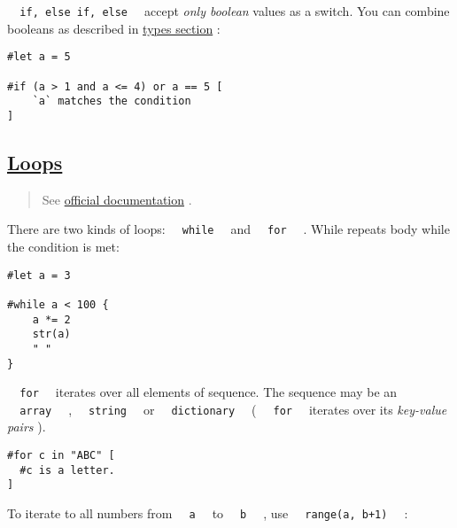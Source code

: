 \texttt{\ }{\texttt{\ if,\ else\ if,\ else\ }}\texttt{\ } accept
\emph{only boolean} values as a switch. You can combine booleans as
described in \href{./types.html\#boolean-bool}{types section} :

\begin{verbatim}
#let a = 5

#if (a > 1 and a <= 4) or a == 5 [
    `a` matches the condition
]
\end{verbatim}

\pandocbounded{}

\subsection{\texorpdfstring{\hyperref[loops]{Loops}}{Loops}}\label{loops}

\begin{quote}
See \href{https://typst.app/docs/reference/scripting/\#loops}{official
documentation} .
\end{quote}

There are two kinds of loops: \texttt{\ }{\texttt{\ while\ }}\texttt{\ }
and \texttt{\ }{\texttt{\ for\ }}\texttt{\ } . While repeats body while
the condition is met:

\begin{verbatim}
#let a = 3

#while a < 100 {
    a *= 2
    str(a)
    " "
}
\end{verbatim}

\pandocbounded{}

\texttt{\ }{\texttt{\ for\ }}\texttt{\ } iterates over all elements of
sequence. The sequence may be an
\texttt{\ }{\texttt{\ array\ }}\texttt{\ } ,
\texttt{\ }{\texttt{\ string\ }}\texttt{\ } or
\texttt{\ }{\texttt{\ dictionary\ }}\texttt{\ } (
\texttt{\ }{\texttt{\ for\ }}\texttt{\ } iterates over its
\emph{key-value pairs} ).

\begin{verbatim}
#for c in "ABC" [
  #c is a letter.
]
\end{verbatim}

\pandocbounded{}

To iterate to all numbers from \texttt{\ }{\texttt{\ a\ }}\texttt{\ } to
\texttt{\ }{\texttt{\ b\ }}\texttt{\ } , use
\texttt{\ }{\texttt{\ range(a,\ b+1)\ }}\texttt{\ } :


